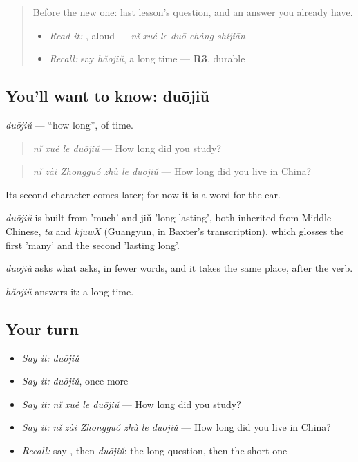 \begin{quote}
Before the new one: last lesson's question, and an answer you already have.

\begin{itemize}
\raggedright
  \item \emph{Read it:} , aloud — \emph{nǐ xué le duō cháng shíjiān}
  \item \emph{Recall:} say \emph{hǎojiǔ}, a long time — \textbf{R3}, durable
\end{itemize}
\end{quote}

\subsection*{You'll want to know: duōjiǔ}
\emph{duōjiǔ} — \textquotedblleft{}how long\textquotedblright{}, of time.

\begin{quote}
\emph{nǐ xué le duōjiǔ} — How long did you study?
\end{quote}

\begin{quote}
\emph{nǐ zài Zhōngguó zhù le duōjiǔ} — How long did you live in China?
\end{quote}

Its second character comes later; for now it is a word for the ear.

\begin{cousinweb}
\emph{duōjiǔ} is built from  'much' and jiǔ 'long-lasting', both inherited from Middle Chinese, \emph{ta} and \emph{kjuwX} (Guangyun, in Baxter's transcription), which glosses the first 'many' and the second 'lasting long'.
\end{cousinweb}

\begin{grammarlens}[title={What you've built}]
\emph{duōjiǔ} asks what  asks, in fewer words, and it takes the same place, after the verb.

\emph{hǎojiǔ} answers it: a long time.
\end{grammarlens}

\subsection*{Your turn}
\begin{itemize}
\raggedright
  \item \emph{Say it:} \emph{duōjiǔ}
  \item \emph{Say it:} \emph{duōjiǔ}, once more
  \item \emph{Say it:} \emph{nǐ xué le duōjiǔ} — How long did you study?
  \item \emph{Say it:} \emph{nǐ zài Zhōngguó zhù le duōjiǔ} — How long did you live in China?
  \item \emph{Recall:} say , then \emph{duōjiǔ}: the long question, then the short one
\end{itemize}


